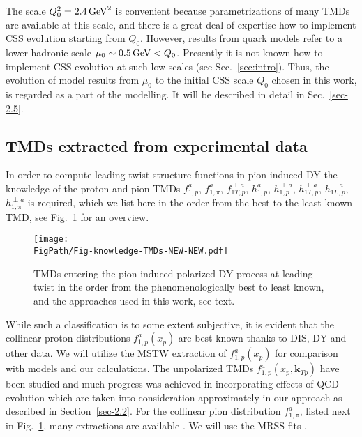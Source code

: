 \documentclass[a4paper]{article}
\def\kTN{{\bm k}_{Tp}}
\newcommand*{\FigPath}{./figs}%
\begin{document}
The scale $Q_0^2=2.4\,{\rm GeV}^2$ is convenient because parametrizations of
many TMDs are available at this scale, and there is a great deal of
expertise how to implement CSS evolution starting from $Q_0$.
However, results from quark models refer to a lower hadronic 
scale $\mu_0 \sim 0.5\,{\rm GeV} < Q_0$. Presently it is not 
known how to implement CSS evolution at such low scales (see Sec.~\ref{sec:intro}). Thus, the evolution of model results from $\mu_0$ 
to the initial CSS scale $Q_0$ chosen in this work, is 
regarded as a part of the modelling. It will be described 
in detail in Sec.~\ref{sec-2.5}.

\subsection{TMDs extracted from experimental data}
\label{sec-2.4}

In order to compute leading-twist structure functions in pion-induced
DY the knowledge of the proton and pion TMDs $f_{1,p}^a$,
$f_{1,\pi}^a$, $f_{1T,p}^{\perp a}$, $h_{1,p}^a$, $h_{1,p}^{\perp a}$,
$h_{1T,p}^{\perp a}$, $h_{1L,p}^{\perp a}$, $h_{1,\pi}^{\perp a}$
is required, which we list here  in the order from the best to the
least known TMD, see Fig.~\ref{Fig-02:knowledge-TMDs} for an overview. 
\begin{figure}[b!] 
\centering 
\texttt{[image: \\FigPath/Fig-knowledge-TMDs-NEW-NEW.pdf]}
\caption{\label{Fig-02:knowledge-TMDs} 
    TMDs entering the pion-induced polarized DY 
    process at leading twist in the order from 
    the phenomenologically best to least known, 
    and the approaches used in this work, see text.}
\end{figure}
While such a classification is to some extent subjective, it is evident that the collinear proton distributions $f_{1,p}^a(x_p)$ 
are best known
\cite{Gluck:1998xa,Martin:2009iq,Harland-Lang:2014zoa,Dulat:2015mca}
thanks to DIS, DY and other data. We will utilize the MSTW extraction 
of $f_{1,p}^a(x_p)$ \cite{Martin:2009iq} for comparison with models 
and our calculations. 
The unpolarized TMDs $f_{1,p}^a(x_p,\kTN)$ have been studied 
and much progress was achieved in incorporating effects of QCD evolution
\cite{Landry:2002ix,Anselmino:2013lza,Signori:2013mda,Bacchetta:2019sam,Scimemi:2019cmh}
which are taken into consideration approximately in our approach
as described in Section~\ref{sec-2.2}. For the collinear pion 
distribution $f_{1,\pi}^a$, listed next in Fig.~\ref{Fig-02:knowledge-TMDs}, 
many extractions are available
\cite{Gluck:1991ey,Sutton:1991ay,Gluck:1999xe,Aicher:2010cb,Barry:2018ort,Novikov:2020snp}. We will use the MRSS fits \cite{Sutton:1991ay}.
\end{document}
